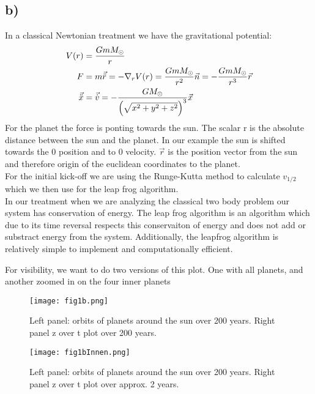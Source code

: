 \subsection{b)}
In a classical Newtonian treatment we have the gravitational potential:
\begin{align}
    V(r) &= \frac{GmM_\odot}{r}\\
    F &= m  \Vec{\ddot r} = - \nabla_r V(r) = \frac{GmM_\odot}{r^2} \Vec{n} = - \frac{GmM_\odot}{r^3} \Vec{r}\\
   \Vec{\ddot  x} &= \Vec{\dot  v} = - \frac{GM_\odot}{\left({\sqrt{x^2+y^2+z^2}}\right)^3} \Vec{x}
\end{align}
For the planet the force is ponting towards the sun. The scalar r is the absolute distance between the sun and the planet. In our example the sun is shifted towards the 0 position and to 0 velocity. $\Vec{r}$ is the position vector from the sun and therefore origin of the euclidean coordinates to the planet. \\
For the initial kick-off we are using the Runge-Kutta method to calculate $v_{1/2}$ which we then use for the leap frog algorithm. \\
In our treatment when we are analyzing the classical two body problem our system has conservation of energy. The leap frog algorithm is an algorithm which due to its time reversal respects this conservaiton of energy and does not add or substract energy from the system. Additionally, the leapfrog algorithm is relatively simple to implement and computationally efficient.

For visibility, we want to do two versions of this plot. One with all planets, and another zoomed in on the four inner planets
\begin{figure}[h!]
    \centering
    \texttt{[image: fig1b.png]}
    \caption{Left panel: orbits of planets around the sun over 200 years. Right panel z over t plot over 200 years.}
\end{figure}

\begin{figure}[h!]
    \centering
    \texttt{[image: fig1bInnen.png]}
    \caption{Left panel: orbits of planets around the sun over 200 years. Right panel z over t plot over approx. 2 years.}
\end{figure}





